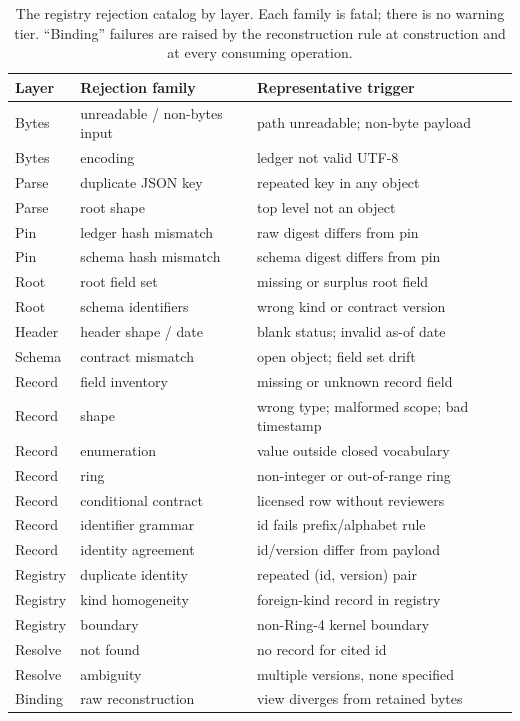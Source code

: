 \begin{table}[ht]
\centering
\begin{tabular}{lll}
\toprule
Layer & Rejection family & Representative trigger \\
\midrule
Bytes & unreadable / non-bytes input & path unreadable; non-byte payload \\
Bytes & encoding & ledger not valid UTF-8 \\
Parse & duplicate JSON key & repeated key in any object \\
Parse & root shape & top level not an object \\
Pin & ledger hash mismatch & raw digest differs from pin \\
Pin & schema hash mismatch & schema digest differs from pin \\
Root & root field set & missing or surplus root field \\
Root & schema identifiers & wrong kind or contract version \\
Header & header shape / date & blank status; invalid as-of date \\
Schema & contract mismatch & open object; field set drift \\
Record & field inventory & missing or unknown record field \\
Record & shape & wrong type; malformed scope; bad timestamp \\
Record & enumeration & value outside closed vocabulary \\
Record & ring & non-integer or out-of-range ring \\
Record & conditional contract & licensed row without reviewers \\
Record & identifier grammar & id fails prefix/alphabet rule \\
Record & identity agreement & id/version differ from payload \\
Registry & duplicate identity & repeated (id, version) pair \\
Registry & kind homogeneity & foreign-kind record in registry \\
Registry & boundary & non-Ring-4 kernel boundary \\
Resolve & not found & no record for cited id \\
Resolve & ambiguity & multiple versions, none specified \\
Binding & raw reconstruction & view diverges from retained bytes \\
\bottomrule
\end{tabular}
\caption{The registry rejection catalog by layer. Each family is fatal;
there is no warning tier. ``Binding'' failures are raised by the
reconstruction rule at construction and at every consuming operation.}
\label{ch06:tab:catalog}
\end{table}

